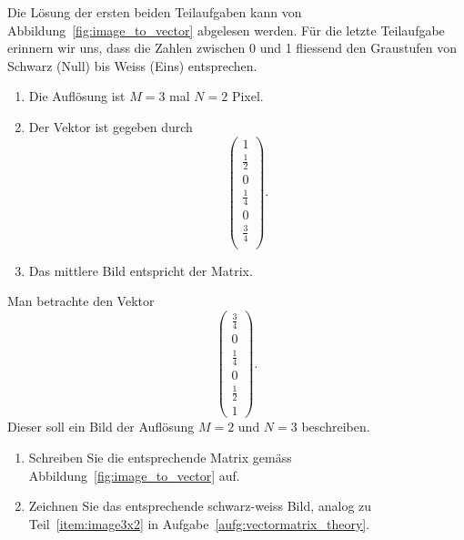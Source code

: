 \begin{losung}
	Die Lösung der ersten beiden Teilaufgaben kann von Abbildung~\ref{fig:image_to_vector} abgelesen werden.
	Für die letzte Teilaufgabe erinnern wir uns, dass die Zahlen zwischen 0 und 1 fliessend den Graustufen von Schwarz (Null) bis Weiss (Eins) entsprechen.
	\begin{enumerate}[label=(\alph*)]
		\item Die Auflösung ist $M=3$ mal $N=2$ Pixel.
		\item Der Vektor ist gegeben durch
		\begin{equation*}
			\begin{pmatrix}
				1 \\ \frac{1}{2} \\ 0 \\ \frac{1}{4} \\ 0 \\ \frac{3}{4} \\
			\end{pmatrix}.
		\end{equation*}
		\item Das mittlere Bild entspricht der Matrix.
	\end{enumerate}
\end{losung}
\begin{aufgabe} \label{aufg:vectormatrix_theory_1}
	Man betrachte den Vektor
	\begin{equation*}
		\begin{pmatrix}
			\frac{3}{4} \\ 0 \\ \frac{1}{4} \\ 0 \\ \frac{1}{2} \\ 1
		\end{pmatrix}.
	\end{equation*}
	Dieser soll ein Bild der Auflösung $M=2$ und $N=3$ beschreiben.
	\begin{enumerate}[label=(\alph*)]
		\item Schreiben Sie die entsprechende Matrix gemäss Abbildung~\ref{fig:image_to_vector} auf.
		\item Zeichnen Sie das entsprechende schwarz-weiss Bild, analog zu Teil~\ref{item:image3x2} in Aufgabe~\ref{aufg:vectormatrix_theory}.
	\end{enumerate}
\end{aufgabe}
